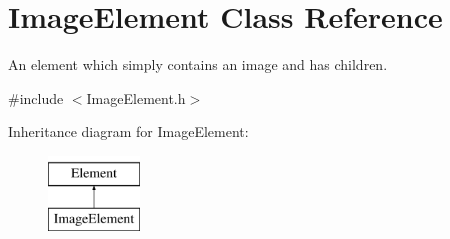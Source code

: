 \hypertarget{class_image_element}{\section{Image\-Element Class Reference}
\label{class_image_element}
}


An element which simply contains an image and has children.  




{\ttfamily \#include $<$Image\-Element.\-h$>$}

Inheritance diagram for Image\-Element\-:\begin{figure}[H]
\begin{center}
\leavevmode
\includegraphics[height=2.000000cm]{class_image_element}
\end{center}
\end{figure}
